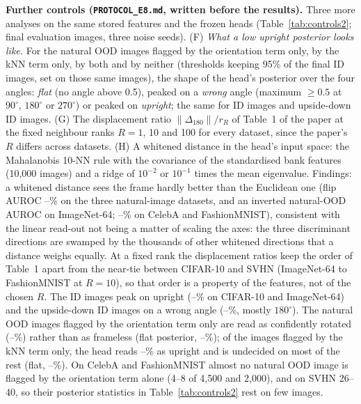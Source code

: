 \documentclass[10pt]{article}
\begin{document}
\textbf{Further controls (\texttt{PROTOCOL\_E8.md}, written before the results).} Three more analyses on the same stored features and the frozen heads (Table~\ref{tab:controls2}; final evaluation images, three noise seeds). (F) \emph{What a low upright posterior looks like.} For the natural OOD images flagged by the orientation term only, by the kNN term only, by both and by neither (thresholds keeping 95\% of the final ID images, set on those same images), the shape of the head's posterior over the four angles: \emph{flat} (no angle above 0.5), peaked on a \emph{wrong} angle (maximum $\ge0.5$ at $90^\circ$, $180^\circ$ or $270^\circ$) or peaked on \emph{upright}; the same for ID images and upside-down ID images. (G) The displacement ratio $\|\Delta_{180}\|/r_R$ of Table~1 of the paper at the fixed neighbour ranks $R=1$, 10 and 100 for every dataset, since the paper's $R$ differs across datasets. (H) A whitened distance in the head's input space: the Mahalanobis 10-NN rule with the covariance of the standardised bank features (10{,}000 images) and a ridge of $10^{-2}$ or $10^{-1}$ times the mean eigenvalue. Findings: a whitened distance sees the frame hardly better than the Euclidean one (flip AUROC \whVfNatMin--\whVfNatMax\% on the three natural-image datasets, and an inverted natural-OOD AUROC on ImageNet-64; \whBVfAliMin--\whAVfAliMax\% on CelebA and FashionMNIST), consistent with the linear read-out not being a matter of scaling the axes: the three discriminant directions are swamped by the thousands of other whitened directions that a distance weighs equally. At a fixed rank the displacement ratios keep the order of Table~1 apart from the near-tie between CIFAR-10 and SVHN (ImageNet-64 \ratioRtenIN{} to FashionMNIST \ratioRtenFM{} at $R=10$), so that order is a property of the features, not of the chosen $R$. The ID images peak on upright (\psIdUpBigMin--\psIdUpBigMax\% on CIFAR-10 and ImageNet-64) and the upside-down ID images on a wrong angle (\psVfWrongBigMin--\psVfWrongBigMax\%, mostly $180^\circ$). The natural OOD images flagged by the orientation term only are read as confidently rotated (\psOrOnlyWrongBigMin--\psOrOnlyWrongBigMax\%) rather than as frameless (flat posterior, \psOrOnlyFlatBigMin--\psOrOnlyFlatBigMax\%); of the images flagged by the kNN term only, the head reads \psKnnOnlyUpBigMin--\psKnnOnlyUpBigMax\% as upright and is undecided on most of the rest (flat, \psKnnOnlyFlatBigMin--\psKnnOnlyFlatBigMax\%). On CelebA and FashionMNIST almost no natural OOD image is flagged by the orientation term alone (4--8 of 4{,}500 and 2{,}000), and on SVHN 26--40, so their posterior statistics in Table~\ref{tab:controls2} rest on few images.
\end{document}
